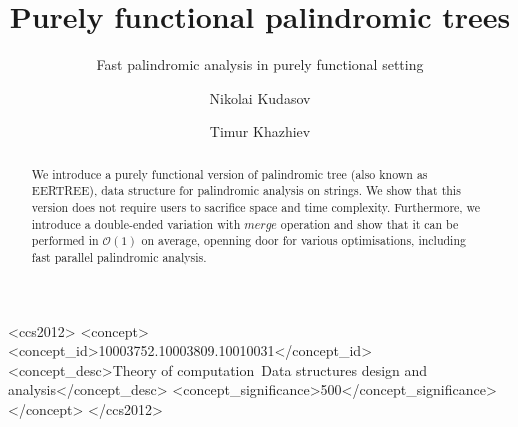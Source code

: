\documentclass[sigplan]{acmart}
\begin{document}
\title{Purely functional palindromic trees}
\subtitle{Fast palindromic analysis in purely functional setting}


\author{Nikolai Kudasov}

\author{Timur Khazhiev}

\begin{abstract}
  We introduce a purely functional version of
  palindromic tree (also known as EERTREE), data structure
  for palindromic analysis on strings. We show that
  this version does not require users to sacrifice
  space and time complexity. Furthermore, we introduce
  a double-ended variation with $merge$ operation and
  show that it can be performed in $\mathcal{O}(1)$
  on average, openning door for various optimisations,
  including fast parallel palindromic analysis.
\end{abstract}

%
%
\begin{CCSXML}
<ccs2012>
<concept>
<concept_id>10003752.10003809.10010031</concept_id>
<concept_desc>Theory of computation~Data structures design and analysis</concept_desc>
<concept_significance>500</concept_significance>
</concept>
</ccs2012>
\end{CCSXML}



\maketitle





\end{document}
